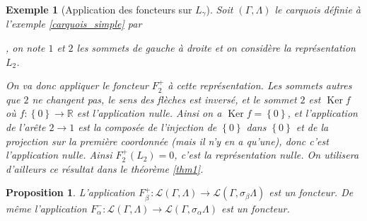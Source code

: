 \documentclass[a4paper,11pt]{article}
\newtheorem{prop}[thm]{Proposition}%
\newtheorem{ex}[thm]{Exemple}%
\DeclareMathOperator{\Ker}{Ker}
\begin{document}
\begin{ex}[Application des foncteurs sur $L_{\gamma}$]
	Soit $(\Gamma,\Lambda)$ le carquois définie à l'exemple \ref{carquois_simple} par 
		, on note $1$ et $2$ les sommets de gauche à droite et on considère la représentation $L_{2}$.
		\begin{center}
	\end{center}
	On va donc appliquer le foncteur $F_2^+$ à cette représentation. Les sommets autres que $2$ ne changent pas, le sens des flèches est inversé, et le sommet $2$ est $\Ker f$ où $f:\left\{ 0 \right\}\longrightarrow \mathbb R$ est l'application nulle. Ainsi on a $\Ker f=\left\{ 0 \right\}$, et l'application de l'arête $2\rightarrow 1$ est la composée de l'injection de $\left\{ 0 \right\}$ dans $\left\{ 0 \right\}$ et de la projection sur la première coordonnée (mais il n'y en a qu'une), donc c'est l'application nulle. Ainsi $F_2^+(L_2)=0$, c'est la représentation nulle. On utilisera d'ailleurs ce résultat dans le théorème \ref{thm1}.
\end{ex}

\begin{prop}
	L'application $F_{\beta}^{+}:\mathscr{L}(\Gamma,\Lambda)\rightarrow\mathscr{L}(\Gamma,\sigma_{\beta}\Lambda)$ est un foncteur. De même l'application $F_{\alpha}^{-}:\mathscr{L}(\Gamma,\Lambda)\rightarrow\mathscr{L}(\Gamma,\sigma_{\alpha}\Lambda)$ est un foncteur.
\end{prop}
\end{document}
